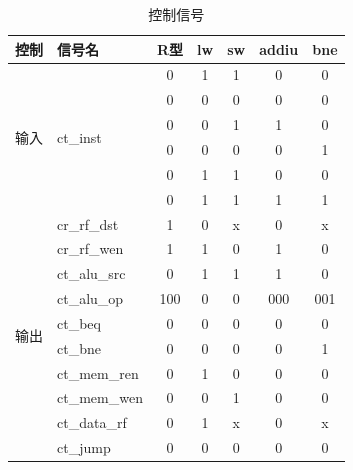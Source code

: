 \documentclass[]{USTBReport}
\begin{document}
    \begin{table}
        \centering
        \caption{控制信号}
        \begin{tabularx}{\linewidth}{@{\extracolsep\fill}llccccc@{\extracolsep\fill}}
            \toprule
            控制                       & 信号名                           & R型  & lw & sw & addiu & bne \\
            \midrule
            \multirow{6}[12]{*}{输入}  & \multirow{6}[12]{*}{ct\_inst} & 0   & 1  & 1  & 0     & 0   \\
            \cmidrule{3-7}           &                               & 0   & 0  & 0  & 0     & 0   \\
            \cmidrule{3-7}           &                               & 0   & 0  & 1  & 1     & 0   \\
            \cmidrule{3-7}           &                               & 0   & 0  & 0  & 0     & 1   \\
            \cmidrule{3-7}           &                               & 0   & 1  & 1  & 0     & 0   \\
            \cmidrule{3-7}           &                               & 0   & 1  & 1  & 1     & 1   \\
            \midrule
            \multirow{10}[20]{*}{输出} & cr\_rf\_dst                   & 1   & 0  & x  & 0     & x   \\
            \cmidrule{2-7}           & cr\_rf\_wen                   & 1   & 1  & 0  & 1     & 0   \\
            \cmidrule{2-7}           & ct\_alu\_src                  & 0   & 1  & 1  & 1     & 0   \\
            \cmidrule{2-7}           & ct\_alu\_op                   & 100 & 0  & 0  & 000   & 001 \\
            \cmidrule{2-7}           & ct\_beq                       & 0   & 0  & 0  & 0     & 0   \\
            \cmidrule{2-7}           & ct\_bne                       & 0   & 0  & 0  & 0     & 1   \\
            \cmidrule{2-7}           & ct\_mem\_ren                  & 0   & 1  & 0  & 0     & 0   \\
            \cmidrule{2-7}           & ct\_mem\_wen                  & 0   & 0  & 1  & 0     & 0   \\
            \cmidrule{2-7}           & ct\_data\_rf                  & 0   & 1  & x  & 0     & x   \\
            \cmidrule{2-7}           & ct\_jump                      & 0   & 0  & 0  & 0     & 0   \\
            \bottomrule
        \end{tabularx}%
        \label{tab:2}%
    \end{table}%
\end{document}
